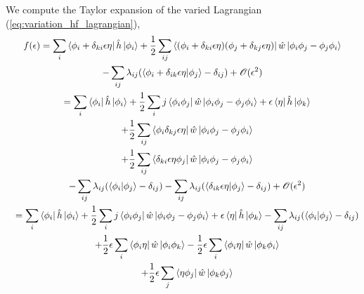    We compute the Taylor expansion of the varied Lagrangian
    (\autoref{eq:variation_hf_lagrangian}),
    \begin{gather}
        \begin{gathered}
            f(\epsilon) =
            \sum_i \bra{\phi_i + \delta_{ki}\epsilon\eta} \hat{h} \ket{\phi_i}
            + \frac{1}{2} \sum_{ij} 
            \bra{(\phi_i + \delta_{ki}\epsilon\eta)(\phi_j + \delta_{kj}\epsilon\eta)}
            \hat{w} \ket{\phi_i\phi_j - \phi_j\phi_i} \\
            - \sum_{ij} \lambda_{ij} (\bra{\phi_i + \delta_{ik} \epsilon\eta}
                \ket{\phi_j} - \delta_{ij}) + \mathscr{O}(\epsilon^2)
        \end{gathered} \\
        \quad 
        \begin{gathered}
            =
            \sum_i \bra{\phi_i} \hat{h} \ket{\phi_i} 
                + \frac{1}{2} \sum_ij \bra{\phi_i \phi_j} \hat{w} 
                    \ket{\phi_i \phi_j - \phi_j \phi_i}
                + \epsilon\bra{\eta} \hat{h} \ket{\phi_k} \\
            + \frac{1}{2} \sum_{ij}\bra{\phi_i\delta_{kj}\epsilon\eta}\hat{w}
                \ket{\phi_i\phi_j - \phi_j\phi_i} \\
            + \frac{1}{2} \sum_{ij}\bra{\delta_{ki}\epsilon\eta\phi_j}\hat{w} 
                \ket{\phi_i\phi_j - \phi_j\phi_i} \\
            - \sum_{ij} \lambda_{ij}(\braket{\phi_i}{\phi_j} - \delta_{ij})
            - \sum_{ij} \lambda_{ij}(\braket{\delta_{ik}\epsilon\eta}{\phi_j} - \delta_{ij})
                + \mathscr{O}(\epsilon^2)
        \end{gathered} \\
        \quad
        \begin{gathered}
            =
            \sum_i \bra{\phi_i} \hat{h} \ket{\phi_i} 
            + \frac{1}{2} \sum_ij \bra{\phi_i \phi_j} \hat{w} 
                    \ket{\phi_i \phi_j - \phi_j \phi_i}
            + \epsilon\bra{\eta} \hat{h} \ket{\phi_k}
            - \sum_{ij}\lambda_{ij}(\braket{\phi_i}{\phi_j} - \delta_{ij}) \\
            + \frac{1}{2} \epsilon \sum_i \bra{\phi_i\eta} \hat{w}
                \ket{\phi_i \phi_k}
            - \frac{1}{2} \epsilon \sum_i \bra{\phi_i\eta} \hat{w}
                \ket{\phi_k \phi_i} \\
            + \frac{1}{2} \epsilon \sum_j \bra{\eta\phi_j} \hat{w}
                \ket{\phi_k \phi_j}

\end{gathered}
\end{gather}
